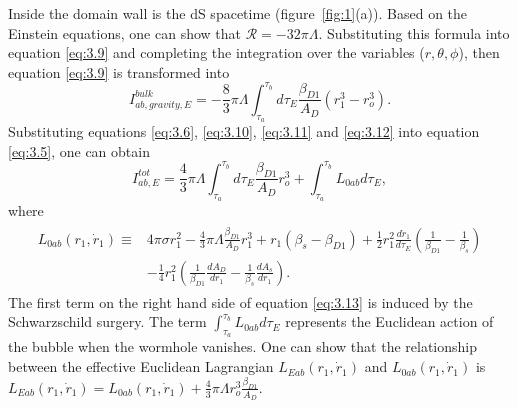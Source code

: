 \documentclass[12pt]{article}
\begin{document}
Inside the domain wall is the dS spacetime (figure~\ref{fig:1}(a)). Based on the Einstein equations, one can show that $\mathscr{R}=-32\pi\Lambda$. Substituting this formula into equation \eqref{eq:3.9} and completing the integration over the variables ($r, \theta, \phi$), then equation \eqref{eq:3.9} is transformed into
\begin{equation}
\label{eq:3.12}%
I^{bulk}_{ab,gravity,E}=-\frac{8}{3}\pi\Lambda\int_{\tau_{a}}^{\tau_{b}}d\tau_{E}\frac{\beta_{D1}}{A_{D}}(r_{1}^{3}-r_{o}^{3}).
\end{equation}
Substituting equations \eqref{eq:3.6}, \eqref{eq:3.10}, \eqref{eq:3.11} and \eqref{eq:3.12} into equation \eqref{eq:3.5}, one  can obtain
\begin{equation}
\label{eq:3.13}%
I^{tot}_{ab,E}=\frac{4}{3}\pi\Lambda\int_{\tau_{a}}^{\tau_{b}}d\tau_{E}\frac{\beta_{D1}}{A_{D}}r_{o}^{3}+ \int_{\tau_{a}}^{\tau_{b}}L_{0ab}d\tau_{E},
\end{equation}
where
\begin{eqnarray}\begin{split}
\label{eq:3.13a}%
L_{0ab}(r_{1},\dot{r}_{1})\equiv &4\pi\sigma r_{1}^{2}-\frac{4}{3}\pi\Lambda\frac{\beta_{D1}}{A_{D}}r_{1}^{3}
+r_{1}(\beta_{s}-\beta_{D1})+\frac{1}{2}r_{1}^{2}\frac{d\dot{r}_{1}}{d\tau_{E}}(\frac{1}{\beta_{D1}}-\frac{1}{\beta_{s}})\\&-
\frac{1}{4}r_{1}^{2}(\frac{1}{\beta_{D1}}\frac{dA_{D}}{dr_{1}}-\frac{1}{\beta_{s}}\frac{dA_{s}}{dr_{1}}).
\end{split}
\end{eqnarray}
The first term on the right hand side of equation \eqref{eq:3.13} is induced by the Schwarzschild surgery. The term $\int_{\tau_{a}}^{\tau_{b}}L_{0ab}d\tau_{E}$ represents the Euclidean action of the bubble when the wormhole vanishes. One can show that the relationship between the effective Euclidean Lagrangian $L_{Eab}(r_{1},\dot{r}_{1})$ and $L_{0ab}(r_{1},\dot{r}_{1})$ is $L_{Eab}(r_{1},\dot{r}_{1})=L_{0ab}(r_{1},\dot{r}_{1})+\frac{4}{3}\pi\Lambda r_{o}^{3}\frac{\beta_{D1}}{A_{D}}$.
\end{document}
